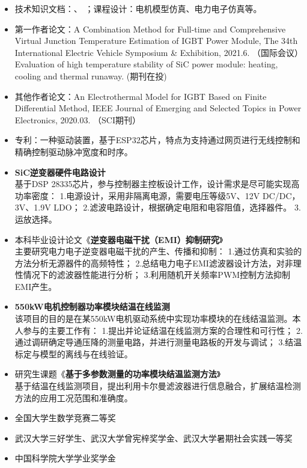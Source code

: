 \documentclass[zh]{resume}
\begin{document}
\begin{itemize}
  \item 技术知识文档：、
  ；课程设计：电机模型仿真、电力电子仿真等。
  \item 第一作者论文：{\small A Combination Method for Full-time and Comprehensive Virtual Junction Temperature Estimation of IGBT Power Module, The 34th International Electric Vehicle Symposium \& Exhibition, 2021.6. （国际会议）}\\ 
  {\small Evaluation of high temperature stability of SiC power module: heating, cooling and thermal runaway. (期刊在投)}
  \item 其他作者论文：{\small An Electrothermal Model for IGBT Based on Finite Differential Method, IEEE Journal of Emerging and Selected Topics in Power Electronics, 2020.03. 
  （SCI期刊） }
  \item 专利：一种驱动装置，基于ESP32芯片，特点为支持通过网页进行无线控制和精确控制驱动脉冲宽度和时序。
\end{itemize}

\begin{itemize}
  \item \textbf{SiC逆变器硬件电路设计}\\
  {\small 基于DSP 28335芯片，参与控制器主控板设计工作，设计需求是尽可能实现高功率密度：
  1.电源设计，采用非隔离电源，需要电压等级5V、12V DC/DC，3V、1.9V LDO；
  2.滤波电路设计，根据确定电阻和电容阻值，选择器件。
  3.运放选择。}
  \item 本科毕业设计论文《\textbf{逆变器电磁干扰（EMI）抑制研究}》\\ 
  {\small 主要研究电力电子逆变器电磁干扰的产生、传播和抑制：
  1.通过仿真和实验的方法分析无源器件的高频特性；
  2.总结电力电子EMI滤波器设计方法，对非理性情况下的滤波器性能进行分析；
  3.利用随机开关频率PWM控制方法抑制EMI产生。}
  \item \textbf{550kW电机控制器功率模块结温在线监测}\\
  {\small 该项目的目的是在某550kW电机驱动系统中实现功率模块的在线结温监测。本人参与的主要工作有：
  1.提出并论证结温在线监测方案的合理性和可行性；
  2.通过调研确定导通压降的测量电路，并进行测量电路板的开发与调试；
  3.结温标定与模型的离线与在线验证。}
  \item 研究生课题《\textbf{基于多参数测量的功率模块结温监测方法}》\\ 
  {\small 基于结温在线监测项目，提出利用卡尔曼滤波器进行信息融合，扩展结温检测方法的应用工况范围和准确度。}
\end{itemize}

\begin{itemize}
  \item 全国大学生数学竞赛二等奖
  \item 武汉大学三好学生、武汉大学曾宪梓奖学金、武汉大学暑期社会实践一等奖
  \item 中国科学院大学学业奖学金
\end{itemize}
\end{document}
